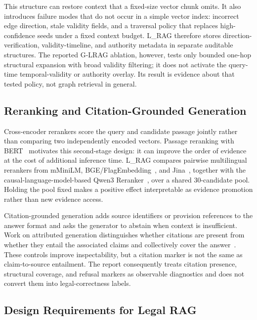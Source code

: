 This structure can restore context that a fixed-size vector chunk omits. It
also introduces failure modes that do not occur in a simple vector index:
incorrect edge direction, stale validity fields, and a traversal policy that
replaces high-confidence seeds under a fixed context budget. L\_RAG therefore
stores direction-verification, validity-timeline, and authority metadata in
separate auditable structures. The reported G-LRAG ablation, however, tests
only bounded one-hop structural expansion with broad validity filtering; it
does not activate the query-time temporal-validity or authority overlay. Its
result is evidence about that tested policy, not graph retrieval in general.

\subsection{Reranking and Citation-Grounded Generation}
\label{sec:related-reranking}

Cross-encoder rerankers score the query and candidate passage jointly rather
than comparing two independently encoded vectors. Passage reranking with
BERT~\cite{nogueira2019passage} motivates this second-stage design: it can
improve the order of evidence at the cost of additional inference time. L\_RAG
compares pairwise multilingual rerankers from mMiniLM,
BGE/FlagEmbedding~\cite{chen2024bge}, and Jina~\cite{jina2024jina}, together
with the causal-language-model-based Qwen3 Reranker~\cite{qwen2025qwen3}, over
a shared 30-candidate pool. Holding the pool fixed makes a positive effect
interpretable as evidence promotion rather than new evidence access.

Citation-grounded generation adds source identifiers or provision references
to the answer format and asks the generator to abstain when context is
insufficient. Work on attributed generation distinguishes whether citations
are present from whether they entail the associated claims and collectively
cover the answer~\cite{gao2023enabling}. These controls improve
inspectability, but a citation marker is not the same as claim-to-source
entailment. The report consequently treats citation presence, structural
coverage, and refusal markers as observable diagnostics and does not convert
them into legal-correctness labels.

\subsection{Design Requirements for Legal RAG}
\label{sec:related-requirements}

